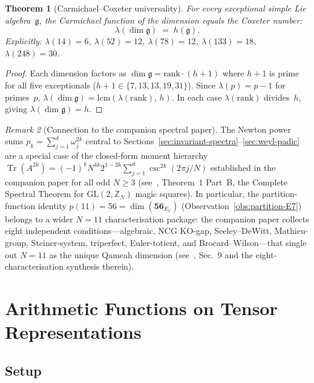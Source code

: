 \documentclass[11pt]{amsart}
\theoremstyle{plain}
\newtheorem{theorem}{Theorem}[section]
\theoremstyle{definition}
\theoremstyle{remark}
\newtheorem{remark}[theorem]{Remark}
\begin{document}
\begin{theorem}[Carmichael--Coxeter universality]\label{thm:carmichael}
For every exceptional simple Lie algebra~$\mathfrak{g}$,
the Carmichael function of the dimension equals the Coxeter number:
\[
\lambda(\dim\mathfrak{g}) \;=\; h(\mathfrak{g}).
\]
Explicitly: $\lambda(14)=6$, $\lambda(52)=12$, $\lambda(78)=12$,
$\lambda(133)=18$, $\lambda(248)=30$.
\end{theorem}
\begin{proof}
Each dimension factors as $\dim\mathfrak{g} = \mathrm{rank} \cdot (h+1)$
where $h+1$ is prime for all five exceptionals
($h+1 \in \{7,13,13,19,31\}$).
Since $\lambda(p) = p-1$ for primes~$p$,
$\lambda(\dim\mathfrak{g}) = \mathrm{lcm}(\lambda(\mathrm{rank}), \, h)$.
In each case $\lambda(\mathrm{rank})$ divides~$h$, giving
$\lambda(\dim\mathfrak{g}) = h$.
\end{proof}

\begin{remark}[Connection to the companion spectral paper]\label{rem:companion-spectral}
The Newton power sums $p_k = \sum_{j=1}^d \omega_j^{2k}$ central to
Sections~\ref{sec:invariant-spectra}--\ref{sec:weyl-padic} are a special
case of the closed-form moment hierarchy
$\operatorname{Tr}(A^{2k})
= (-1)^k N^{4k} 2^{1-2k} \sum_{j=1}^d
  \csc^{2k}(2\pi j/N)$
established in the companion paper for all odd $N \geq 3$
(see~\cite{QHOTS2026}, Theorem~1 Part~B, the Complete Spectral Theorem
for $\mathrm{GL}(2,\mathbb{Z}_N)$ magic squares).
In particular, the partition-function identity $p(11) = 56 = \dim(\mathbf{56}_{E_7})$
(Observation~\ref{obs:partition-E7}) belongs to a wider $N = 11$
characterisation package: the companion paper collects eight independent
conditions---algebraic, NCG KO-gap, Seeley--DeWitt, Mathieu-group,
Steiner-system, triperfect, Euler-totient, and Brocard--Wilson---that
single out $N = 11$ as the unique Qameah dimension
(see~\cite{QHOTS2026}, Sec.~9 and the eight-characterisation synthesis therein).
\end{remark}

\section{Arithmetic Functions on Tensor Representations}%
\label{sec:sym2-wedge2}

\subsection{Setup}
\end{document}
